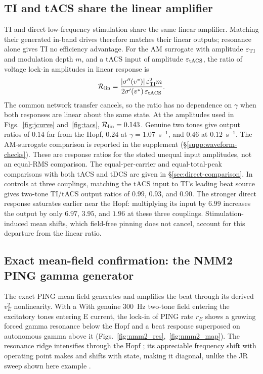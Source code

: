 \documentclass[11pt,a4paper]{article}
\newcommand{\Sig}{\sigma}
\providecommand{\DIFaddtex}[1]{{\protect\color{blue} \sf #1}} %
\providecommand{\DIFdeltex}[1]{{\protect\color{red} \scriptsize #1}} %
\providecommand{\DIFaddbegin}{} %
\providecommand{\DIFaddend}{} %
\providecommand{\DIFdelbegin}{} %
\providecommand{\DIFdelend}{} %
\providecommand{\DIFadd}[1]{\texorpdfstring{\DIFaddtex{#1}}{#1}} %
\providecommand{\DIFdel}[1]{\texorpdfstring{\DIFdeltex{#1}}{}} %
\begin{document}
\subsection{TI and tACS share the linear amplifier}\label{sec:tacs-results}
TI and direct low-frequency stimulation share the same linear amplifier.
Matching their generated in-band drives therefore matches their linear outputs;
resonance alone gives TI no efficiency advantage.
For the AM surrogate with amplitude $\varepsilon_{\rm TI}$ and modulation depth
$m$, and a tACS input of amplitude $\varepsilon_{\rm tACS}$, the ratio of voltage
lock-in amplitudes in linear response is
\[
\mathcal R_{\rm lin}
=\frac{|\Sig''(v^*)|\,\varepsilon_{\rm TI}^2m}{2\Sig'(v^*)\,\varepsilon_{\rm tACS}}.
\]
The common network transfer cancels, so the ratio has no dependence on $\gamma$
when both responses are linear about the same state. At the amplitudes used in
Figs.~\ref{fig:jcurve} and~\ref{fig:tacs}, $\mathcal R_{\rm lin}=0.143$.
Genuine two tones give output ratios of $0.14$ far from the Hopf, $0.24$ at
$\gamma=1.07$~s$^{-1}$, and $0.46$ at $0.12$~s$^{-1}$. The AM-surrogate
comparison is reported in the supplement (\S\ref{supp:waveform-checks}).
These are response ratios for the stated unequal input amplitudes, not an
equal-RMS comparison. The equal-per-carrier and equal-total-peak comparisons
with both tACS and tDCS are given in \S\ref{sec:direct-comparison}.
In controls at three couplings, matching the tACS input
to TI's leading beat source gives two-tone TI/tACS output ratios of $0.99$,
$0.93$, and $0.90$.
The stronger direct response saturates earlier near the Hopf: multiplying
its input by $6.99$ increases the output by only $6.97$, $3.95$, and $1.96$
at these three couplings. Stimulation-induced mean shifts, which field-free
pinning does not cancel, account for this departure from the linear ratio.

\subsection{Exact mean-field confirmation: the NMM2 PING gamma generator}\label{sec:nmm2-results}
\DIFdelbegin \DIFdel{The exact PING mean field generates and amplifies the beat through its derived
$v_E^2$ nonlinearity. With a }\DIFdelend \DIFaddbegin \DIFadd{With genuine }\DIFaddend $300$~Hz \DIFdelbegin \DIFdel{two-tone field entering the excitatory
}\DIFdelend \DIFaddbegin \DIFadd{tones entering E }\DIFaddend current, the \DIFdelbegin \DIFdel{lock-in of }\DIFdelend \DIFaddbegin \DIFadd{PING rate }\DIFaddend $r_E$
shows \DIFdelbegin \DIFdel{a growing }\DIFdelend \DIFaddbegin \DIFadd{forced }\DIFaddend gamma resonance below the Hopf and a \DIFaddbegin \DIFadd{beat }\DIFaddend response superposed
on autonomous gamma above it (Figs.~\ref{fig:nmm2_res},~\ref{fig:nmm2_map}).
The \DIFdelbegin \DIFdel{resonance }\DIFdelend ridge intensifies through the Hopf \DIFdelbegin \DIFdel{; its appreciable frequency shift with operating point makes
}\DIFdelend \DIFaddbegin \DIFadd{and shifts with state, making }\DIFaddend it
diagonal, unlike the JR \DIFdelbegin \DIFdel{sweep shown here }\DIFdelend \DIFaddbegin \DIFadd{example }\DIFaddend \cite{clusella2023}.
\end{document}
